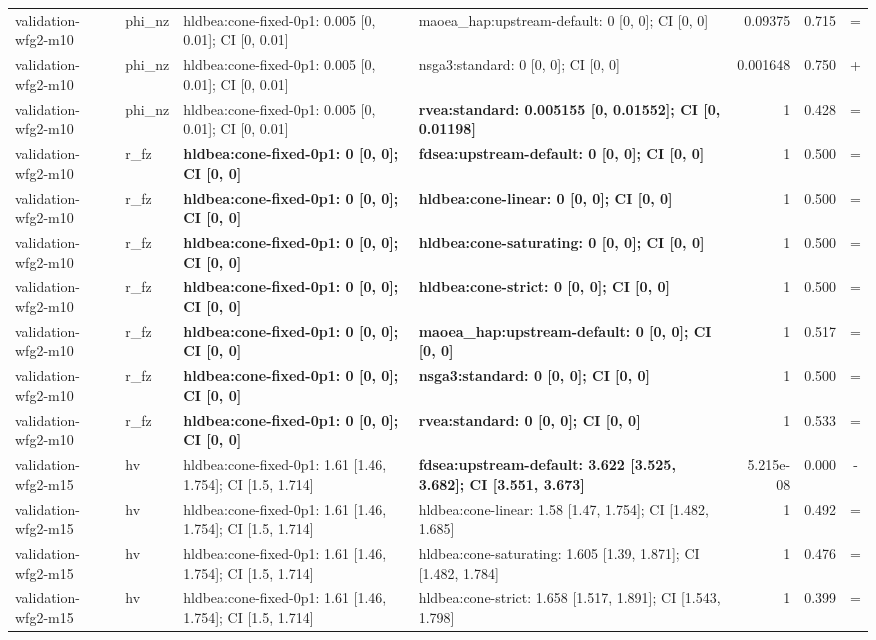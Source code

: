 \begin{tabular}{llllrrc}
validation-wfg2-m10 & phi\_nz & hldbea:cone-fixed-0p1: 0.005 [0, 0.01]; CI [0, 0.01] & maoea\_hap:upstream-default: 0 [0, 0]; CI [0, 0] & 0.09375 & 0.715 & = \\
validation-wfg2-m10 & phi\_nz & hldbea:cone-fixed-0p1: 0.005 [0, 0.01]; CI [0, 0.01] & nsga3:standard: 0 [0, 0]; CI [0, 0] & 0.001648 & 0.750 & + \\
validation-wfg2-m10 & phi\_nz & hldbea:cone-fixed-0p1: 0.005 [0, 0.01]; CI [0, 0.01] & \textbf{rvea:standard: 0.005155 [0, 0.01552]; CI [0, 0.01198]} & 1 & 0.428 & = \\
validation-wfg2-m10 & r\_fz & \textbf{hldbea:cone-fixed-0p1: 0 [0, 0]; CI [0, 0]} & \textbf{fdsea:upstream-default: 0 [0, 0]; CI [0, 0]} & 1 & 0.500 & = \\
validation-wfg2-m10 & r\_fz & \textbf{hldbea:cone-fixed-0p1: 0 [0, 0]; CI [0, 0]} & \textbf{hldbea:cone-linear: 0 [0, 0]; CI [0, 0]} & 1 & 0.500 & = \\
validation-wfg2-m10 & r\_fz & \textbf{hldbea:cone-fixed-0p1: 0 [0, 0]; CI [0, 0]} & \textbf{hldbea:cone-saturating: 0 [0, 0]; CI [0, 0]} & 1 & 0.500 & = \\
validation-wfg2-m10 & r\_fz & \textbf{hldbea:cone-fixed-0p1: 0 [0, 0]; CI [0, 0]} & \textbf{hldbea:cone-strict: 0 [0, 0]; CI [0, 0]} & 1 & 0.500 & = \\
validation-wfg2-m10 & r\_fz & \textbf{hldbea:cone-fixed-0p1: 0 [0, 0]; CI [0, 0]} & \textbf{maoea\_hap:upstream-default: 0 [0, 0]; CI [0, 0]} & 1 & 0.517 & = \\
validation-wfg2-m10 & r\_fz & \textbf{hldbea:cone-fixed-0p1: 0 [0, 0]; CI [0, 0]} & \textbf{nsga3:standard: 0 [0, 0]; CI [0, 0]} & 1 & 0.500 & = \\
validation-wfg2-m10 & r\_fz & \textbf{hldbea:cone-fixed-0p1: 0 [0, 0]; CI [0, 0]} & \textbf{rvea:standard: 0 [0, 0]; CI [0, 0]} & 1 & 0.533 & = \\
validation-wfg2-m15 & hv & hldbea:cone-fixed-0p1: 1.61 [1.46, 1.754]; CI [1.5, 1.714] & \textbf{fdsea:upstream-default: 3.622 [3.525, 3.682]; CI [3.551, 3.673]} & 5.215e-08 & 0.000 & - \\
validation-wfg2-m15 & hv & hldbea:cone-fixed-0p1: 1.61 [1.46, 1.754]; CI [1.5, 1.714] & hldbea:cone-linear: 1.58 [1.47, 1.754]; CI [1.482, 1.685] & 1 & 0.492 & = \\
validation-wfg2-m15 & hv & hldbea:cone-fixed-0p1: 1.61 [1.46, 1.754]; CI [1.5, 1.714] & hldbea:cone-saturating: 1.605 [1.39, 1.871]; CI [1.482, 1.784] & 1 & 0.476 & = \\
validation-wfg2-m15 & hv & hldbea:cone-fixed-0p1: 1.61 [1.46, 1.754]; CI [1.5, 1.714] & hldbea:cone-strict: 1.658 [1.517, 1.891]; CI [1.543, 1.798] & 1 & 0.399 & = \\

\end{tabular}
